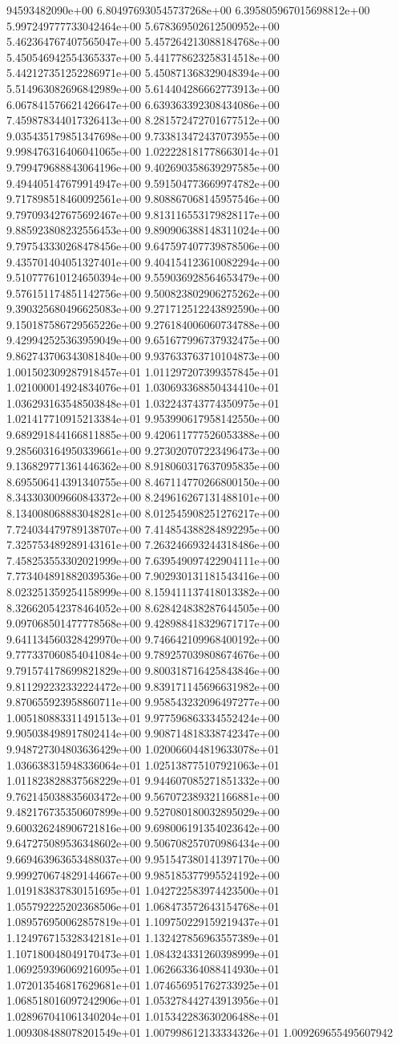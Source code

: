 94593482090e+00	6.804976930545737268e+00	6.395805967015698812e+00	5.997249777733042464e+00	5.678369502612500952e+00	5.462364767407565047e+00	5.457264213088184768e+00	5.450546942554365337e+00	5.441778623258314518e+00	5.442127351252286971e+00	5.450871368329048394e+00	5.514963082696842989e+00	5.614404286662773913e+00	6.067841576621426647e+00	6.639363392308434086e+00	7.459878344017326413e+00	8.281572472701677512e+00	9.035435179851347698e+00	9.733813472437073955e+00	9.998476316406041065e+00	1.022228181778663014e+01	9.799479688843064196e+00	9.402690358639297585e+00	9.494405147679914947e+00	9.591504773669974782e+00	9.717898518460092561e+00	9.808867068145957546e+00	9.797093427675692467e+00	9.813116553179828117e+00	9.885923808232556453e+00	9.890906388148311024e+00	9.797543330268478456e+00	9.647597407739878506e+00	9.435701404051327401e+00	9.404154123610082294e+00	9.510777610124650394e+00	9.559036928564653479e+00	9.576151174851142756e+00	9.500823802906275262e+00	9.390325680496625083e+00	9.271712512243892590e+00	9.150187586729565226e+00	9.276184006060734788e+00	9.429942525363959049e+00	9.651677996737932475e+00	9.862743706343081840e+00	9.937633763710104873e+00	1.001502309287918457e+01	1.011297207399357845e+01	1.021000014924834076e+01	1.030693368850434410e+01	1.036293163548503848e+01	1.032243743774350975e+01	1.021417710915213384e+01	9.953990617958142550e+00	9.689291844166811885e+00	9.420611777526053388e+00	9.285603164950339661e+00	9.273020707223496473e+00	9.136829771361446362e+00	8.918060317637095835e+00	8.695506414391340755e+00	8.467114770266800150e+00	8.343303009660843372e+00	8.249616267131488101e+00	8.134008068883048281e+00	8.012545908251276217e+00	7.724034479789138707e+00	7.414854388284892295e+00	7.325753489289143161e+00	7.263246693244318486e+00	7.458253553302021999e+00	7.639549097422904111e+00	7.773404891882039536e+00	7.902930131181543416e+00	8.023251359254158999e+00	8.159411137418013382e+00	8.326620542378464052e+00	8.628424838287644505e+00	9.097068501477778568e+00	9.428988418329671717e+00	9.641134560328429970e+00	9.746642109968400192e+00	9.777337060854041084e+00	9.789257039808674676e+00	9.791574178699821829e+00	9.800318716425843846e+00	9.811292232332224472e+00	9.839171145696631982e+00	9.870655923958860711e+00	9.958543232096497277e+00	1.005180883311491513e+01	9.977596863334552424e+00	9.905038498917802414e+00	9.908714818338742347e+00	9.948727304803636429e+00	1.020066044819633078e+01	1.036638315948336064e+01	1.025138775107921063e+01	1.011823828837568229e+01	9.944607085271851332e+00	9.762145038835603472e+00	9.567072389321166881e+00	9.482176735350607899e+00	9.527080180032895029e+00	9.600326248906721816e+00	9.698006191354023642e+00	9.647275089536348602e+00	9.506708257070986434e+00	9.669463963653488037e+00	9.951547380141397170e+00	9.999270674829144667e+00	9.985185377995524192e+00	1.019183837830151695e+01	1.042722583974423500e+01	1.055792225202368506e+01	1.068473572643154768e+01	1.089576950062857819e+01	1.109750229159219437e+01	1.124976715328342181e+01	1.132427856963557389e+01	1.107180048049170473e+01	1.084324331260398999e+01	1.069259396069216095e+01	1.062663364088414930e+01	1.072013546817629681e+01	1.074656951762733925e+01	1.068518016097242906e+01	1.053278442743913956e+01	1.028967041061340204e+01	1.015342283630206488e+01	1.009308488078201549e+01	1.007998612133334326e+01	1.009269655495607942